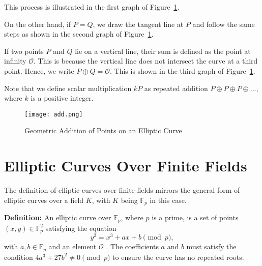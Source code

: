 \documentclass[11pt]{article}
\begin{document}
This process is illustrated in the first graph of Figure~\ref{fig:Add}. 

\vspace{0.3cm}

On the other hand, if \( P = Q \), we draw the tangent line at \( P \) and follow the same steps as shown in the second graph of Figure~\ref{fig:Add}.

\vspace{0.3cm}

If two points \(P\) and \(Q\) lie on a vertical line, their sum is defined as the point at infinity \(\mathcal{O}\). This is because the vertical line does not intersect the curve at a third point. Hence, we write \(P\oplus Q=\mathcal{O}\). This is shown in the third graph of Figure~\ref{fig:Add}.

\vspace{0.3cm}

Note that we define scalar multiplication \(kP\) as repeated addition \(P\oplus P \oplus P \oplus ...\), where \(k\) is a positive integer.

\begin{figure}
    \begin{adjustwidth}{-3cm}{-3cm}
    \centering
    \texttt{[image: add.png]}
    \caption{Geometric Addition of Points on an Elliptic Curve}
    \label{fig:Add}
    \end{adjustwidth}
\end{figure}




\section{Elliptic Curves Over Finite Fields}
The definition of elliptic curves over finite fields mirrors the general form of elliptic curves over a field \( K \), with \( K \) being \( \mathbb{F}_p \) in this case.

\noindent \textbf{Definition:} An elliptic curve over \( \mathbb{F}_p \), where \( p \) is a prime, is a set of points \( (x, y) \in \mathbb{F}_p^2 \) satisfying the equation
\[y^2 = x^3 + ax + b \pmod{p},\]
with \(a, b \in \mathbb{F}_p\) and an element \(\mathcal{O}\) \cite{shevchuk}. The coefficients \(a\) and \(b\) must satisfy the condition \(4a^3 + 27b^2 \neq 0 \pmod{p}\) to ensure the curve has no repeated roots.

\vspace{0.3cm}
\end{document}

